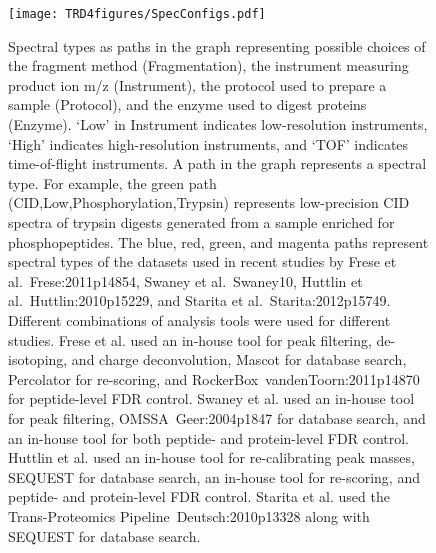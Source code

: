 \begin{figure}[tbp]
\begin{center}
\texttt{[image: TRD4figures/SpecConfigs.pdf]}
\caption{\footnotesize
Spectral types as paths in the graph representing possible choices of
the fragment method (Fragmentation),
the instrument  measuring product ion m/z (Instrument),
the protocol used to prepare a sample (Protocol), %
and the enzyme used to digest proteins (Enzyme). 
`Low' in Instrument indicates low-resolution instruments,
`High' indicates high-resolution instruments,
and `TOF' indicates time-of-flight instruments. 
A path in the graph represents a spectral type.
For example, the green path ({CID,}{Low,}{Phosphorylation,}{Trypsin}) represents low-precision CID spectra of trypsin digests generated from a sample enriched for phosphopeptides.
The blue, red, green, and magenta paths represent spectral types of the datasets used in recent studies by 
Frese et al.~\cite{unv}{Frese:2011p14854}, Swaney et al.~\cite{unv}{Swaney10}, Huttlin et al.~\cite{unv}{Huttlin:2010p15229}, and Starita et al.~\cite{unv}{Starita:2012p15749}. 
Different combinations of analysis tools were used for different studies.
Frese et al. used an in-house tool for peak filtering, de-isotoping, and charge deconvolution, Mascot for database search, Percolator for re-scoring, and RockerBox~\cite{unv}{vandenToorn:2011p14870}  for peptide-level FDR control.
Swaney et al. used an in-house tool for peak filtering, OMSSA~\cite{unv}{Geer:2004p1847} for database search, and an in-house tool for both peptide- and protein-level FDR control.
Huttlin et al. used an in-house tool for re-calibrating peak masses, SEQUEST for database search, an in-house tool for re-scoring, and peptide- and protein-level FDR control.
Starita et al. used the Trans-Proteomics Pipeline~\cite{unv}{Deutsch:2010p13328} along with SEQUEST for database search.
}
\label{MultConfig}
\end{center}
\end{figure}

